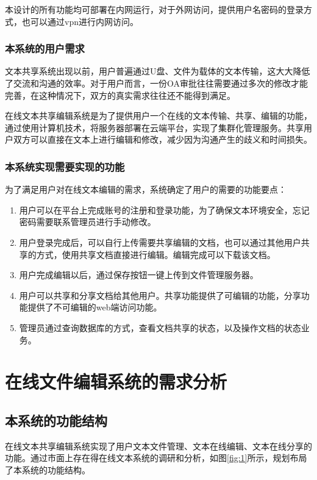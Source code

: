 \documentclass[forprint]{software}
\begin{document}
本设计的所有功能均可部署在内网运行，对于外网访问，提供用户名密码的登录方式，也可以通过vpn进行内网访问。

\subsection{本系统的用户需求}

文本共享系统出现以前，用户普遍通过U盘、文件为载体的文本传输，这大大降低了交流和沟通的效率。对于用户而言，一份OA审批往往需要通过多次的修改才能完善，在这种情况下，双方的真实需求往往还不能得到满足。

在线文本共享编辑系统是为了提供用户一个在线的文本传输、共享、编辑的功能，通过使用计算机技术，将服务器部署在云端平台，实现了集群化管理服务。共享用户双方可以直接在文本上进行编辑和修改，减少因为沟通产生的歧义和时间损失。

\subsection{本系统实现需要实现的功能}

为了满足用户对在线文本编辑的需求，系统确定了用户的需要的功能要点：\\

\begin{enumerate}
	\item 用户可以在平台上完成账号的注册和登录功能，为了确保文本环境安全，忘记密码需要联系管理员进行手动修改。
	\item 用户登录完成后，可以自行上传需要共享编辑的文档，也可以通过其他用户共享的方式，使用共享文档直接进行编辑。编辑完成可以下载该文档。
	\item 用户完成编辑以后，通过保存按钮一键上传到文件管理服务器。
	\item 用户可以共享和分享文档给其他用户。共享功能提供了可编辑的功能，分享功能提供了不可编辑的web端访问功能。
	\item 管理员通过查询数据库的方式，查看文档共享的状态，以及操作文档的状态业务。
\end{enumerate}

\chapter{在线文件编辑系统的需求分析}

\section{本系统的功能结构}

在线文本共享编辑系统实现了用户文本文件管理、文本在线编辑、文本在线分享的功能。通过市面上存在得在线文本系统的调研和分析，如图\ref{fig:1}所示，规划布局了本系统的功能结构。
\end{document}
